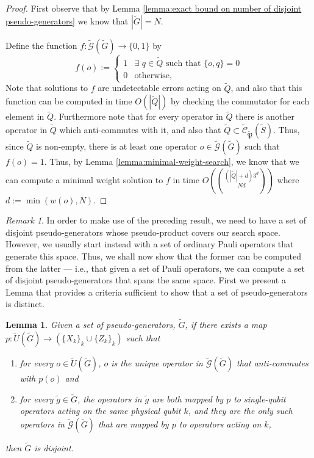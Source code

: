 \documentclass{amsbook}
\theoremstyle{plain}
\newtheorem{lemma}{Lemma}
\theoremstyle{definition}
\theoremstyle{remark}
\newtheorem{remark}{Remark}
\newcommand{\set}{\tilde}
\newcommand{\genfun}{\tilde{\mathcal{G}}}
\newcommand{\pauligroup}{{\set{\mathfrak{P}}}}
\newcommand{\centralizer}{\set{\mathcal{C}}}
\newcommand{\paren}[1]{\left(#1\right)}
\begin{document}
\begin{proof}
First observe that by Lemma \ref{lemma:exact bound on number of disjoint pseudo-generators} we know that $|\set G|=N$.

Define the function $f:\genfun(\set G)\to\{0,1\}$ by
$$f(o):=
\begin{cases}
1 & \exists\,\, q\in\set Q \,\,\text{such that}\,\, \{o,q\}=0\\
0 & \text{otherwise},
\end{cases}
$$
Note that solutions to $f$ are undetectable errors acting on $\set Q$, and also that this function can be computed in time $O(|\set Q|)$ by checking the commutator for each element in $\set Q$.  Furthermore note that for every operator in $\set Q$ there is another operator in $\set Q$ which anti-commutes with it, and also that $\set Q\subset \centralizer_\pauligroup(\set S)$.  Thus, since $\set Q$ is non-empty, there is at least one operator $o\in\genfun(\set G)$ such that $f(o)=1$.  Thus, by Lemma \ref{lemma:minimal-weight-search}, we know that we can compute a minimal weight solution to $f$ in time $O\paren{(|\set Q|+d)3^d\choose{N}{d}}$ where $d:=\min\paren{w(o),N}$.
\end{proof}
\begin{remark}
In order to make use of the preceding result, we need to have a set of disjoint pseudo-generators whose pseudo-product covers our search space.  However, we usually start instead with a set of ordinary Pauli operators that generate this space.  Thus, we shall now show that the former can be computed from the latter --- i.e., that given a set of Pauli operators, we can compute a set of disjoint pseudo-generators that spans the same space.  First we present a Lemma that provides a criteria sufficient to show that a set of pseudo-generators is distinct.
\end{remark}

\begin{lemma}
\label{lemma:disjointness-equvalence}
Given a set of pseudo-generators, $\set G$, if there exists a map $p:\set U(\set G)\to \paren{\{X_k\}_k \cup \{Z_k\}_k}$ such that
\begin{enumerate}
\item for every $o\in\set U(\set G)$, $o$ is the unique operator in $\genfun(\set G)$ that anti-commutes with $p(o)$ and
\item for every $\set g\in\set G$, the operators in $\set g$ are both mapped by $p$ to single-qubit operators acting on the same physical qubit $k$, and they are the only such operators in $\genfun(\set G)$ that are mapped by $p$ to operators acting on $k$,
\end{enumerate}
then $\set G$ is disjoint.
\end{lemma}
\end{document}
